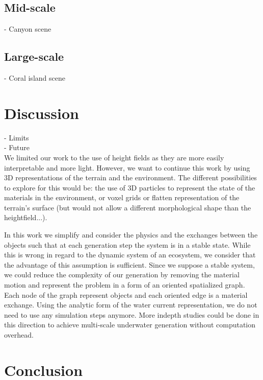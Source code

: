 \documentclass{egpubl}
\begin{document}
\subsection{Mid-scale}
- Canyon scene \\

\subsection{Large-scale}
- Coral island scene\\



\section{Discussion}
- Limits \\

- Future \\
We limited our work to the use of height fields as they are more easily interpretable and more light. However, we want to continue this work by using 3D representations of the terrain and the environment. The different possibilities to explore for this would be: the use of 3D particles to represent the state of the materials in the environment, or voxel grids or flatten representation of the terrain's surface (but would not allow a different morphological shape than the heightfield...).

In this work we simplify and consider the physics and the exchanges between the objects such that at each generation step the system is in a stable state. While this is wrong in regard to the dynamic system of an ecosystem, we consider that the advantage of this assumption is sufficient. Since we suppose a stable system, we could reduce the complexity of our generation by removing the material motion and represent the problem in a form of an oriented spatialized graph. Each node of the graph represent objects and each oriented edge is a material exchange. Using the analytic form of the water current representation, we do not need to use any simulation steps anymore. 
More indepth studies could be done in this direction to achieve multi-scale underwater generation without computation overhead.

\section{Conclusion}

\def\url#1{} %




\end{document}
